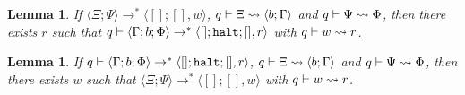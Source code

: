 \documentclass[12pt]{article}
\newcommand{\set}[1]{\{ #1 \}}
\newcommand{\alt}{\;\; | \;\;}
\newcommand{\defi}{\Coloneqq}
\newcommand{\nil}{[]}
\newcommand{\h}[1]{\hat{#1}}
\renewcommand{\H}{H}
\newcommand{\z}{\mathtt{z}}
\newcommand{\suc}{\mathtt{s} \;}
\newcommand{\n}[1]{\overline{#1}}
\newcommand{\rpaddr}[1]{\mathtt{paddr} \; #1}
\newcommand{\rhaddr}[1]{\mathtt{haddr} \; #1}
\newcommand{\rundef}{\mathtt{undef}}
\newcommand{\mload}[1]{\mathtt{load} \; #1}
\newcommand{\mstore}[1]{\mathtt{store} \; #1}
\newcommand{\malloc}[1]{\mathtt{alloc} \; #1}
\newcommand{\mpeek}[1]{\mathtt{peek} \; #1}
\newcommand{\mpushnum}[1]{\mathtt{pushnum} \; #1}
\newcommand{\mpushpaddr}[1]{\mathtt{pushpaddr} \; #1}
\newcommand{\mnewframe}{\mathtt{newframe}}
\newcommand{\mendframe}{\mathtt{endframe}}
\newcommand{\mgetarg}{\mathtt{getarg}}
\newcommand{\mgetenv}{\mathtt{getenv}}
\newcommand{\mgetret}{\mathtt{getret}}
\newcommand{\mjump}{\mathtt{jump}}
\newcommand{\mgetaddr}[1]{\mathtt{getaddr} \; #1}
\newcommand{\mhalt}{\mathtt{halt}}
\newcommand{\mend}{\mathtt{end}}
\newcommand{\ssev}[4]{\ensuremath{\langle #1; #2 \rangle \rightarrow^* \langle #3; #4 \rangle}}
\newcommand{\e}{e} %
\renewcommand{\b}{b} %
\newcommand{\w}{w}
\newcommand{\q}{q}
\renewcommand{\r}{r}
\newcommand{\m}{m}
\renewcommand{\h}{h}
\renewcommand{\o}{o}
\newcommand{\f}{f}
\newcommand{\B}{B}
\renewcommand{\H}{H}
\newcommand{\mfr}[4]{\set{\mathtt{regs}:#1, \mathtt{env}:#2, \mathtt{arg}:#3, \mathtt{ret}:#4}}
\newcommand{\mnil}{[]}
\newcounter{statementcounter}
\newtheorem{lemma}[statementcounter]{Lemma}
\begin{document}
\begin{lemma}
If $\ssev{\Xi}{\Psi}{\mnil}{\mnil, \w}$, $\corstack{\q}{\Xi}{\b}{\Gamma}$ and $\corvaluestack{\q}{\Psi}{\Phi}$, then there exists $\r$ such that $\msteps{\q}{\Gamma}{\b}{\Phi}{\mnil}{\mhalt}{\mnil, \r}$ with $\corvalue{\q}{\w}{\r}$.
\end{lemma}

\begin{lemma}
If $\msteps{\q}{\Gamma}{\b}{\Phi}{\mnil}{\mhalt}{\mnil, \r}$, $\corstack{\q}{\Xi}{\b}{\Gamma}$ and $\corvaluestack{\q}{\Psi}{\Phi}$, then there exists $\w$ such that $\ssev{\Xi}{\Psi}{\mnil}{\mnil, \w}$ with $\corvalue{\q}{\w}{\r}$.
\end{lemma}

%
%
\end{document}
